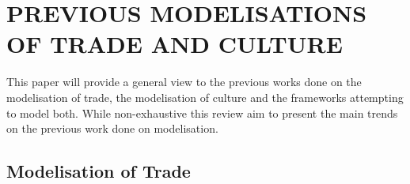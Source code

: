 \documentclass{wscpaperproc}
\begin{document}
\section{PREVIOUS MODELISATIONS OF TRADE AND CULTURE}

This paper will provide a general view to the previous works done on the modelisation of trade, the modelisation of culture and the frameworks attempting to model both. While non-exhaustive this review aim to present the main trends on the previous work done on modelisation.

\subsection{Modelisation of Trade}
\end{document}
